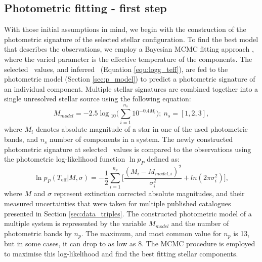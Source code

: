 \subsection{Photometric fitting - first step}
\label{sec:photo_fit}
With those initial assumptions in mind, we begin with the construction of the photometric signature of the selected stellar configuration. To find the best model that describes the observations, we employ a Bayesian MCMC fitting approach \citep{2013PASP..125..306F}, where the varied parameter is the effective temperature of the components. The selected \Teff\ values, and inferred \Logg\ (Equation \ref{equ:logg_teff}), are fed to the photometric model (Section \ref{sec:p_model}) to predict a photometric signature of an individual component. Multiple stellar signatures are combined together into a single unresolved stellar source using the following equation:
\begin{equation}
	M_{model} = -2.5 \log{}_{10} \Big( \sum_{i=1}^{n_s} 10^{-0.4 M_i} \Big); \ n_s=[1, 2, 3],
\end{equation}
where $M_i$ denotes absolute magnitude of a star in one of the used photometric bands, and $n_s$ number of components in a system. The newly constructed photometric signature at selected \Teff\ values is compared to the observations using the photometric log-likelihood function $\ln p_{P}$ defined as:
\begin{equation}
	\label{equ:lnp_p}
	\ln p_{P}(T_\mathrm{eff} | M, \sigma) = -\frac{1}{2} \sum_{i=1}^{n_p} \Big[ \frac{(M_i - M_{model, i})^2}{\sigma_i^2} +ln(2\pi\sigma_i^2) \Big],
\end{equation}
where $M$ and $\sigma$ represent extinction corrected absolute magnitudes, and their measured uncertainties that were taken for multiple published catalogues presented in Section \ref{sec:data_triples}. The constructed photometric model of a multiple system is represented by the variable $M_{model}$ and the number of photometric bands by $n_p$. The maximum, and most common value for $n_p$ is 13, but in some cases, it can drop to as low as 8. The MCMC procedure is employed to maximise this log-likelihood and find the best fitting stellar components.

